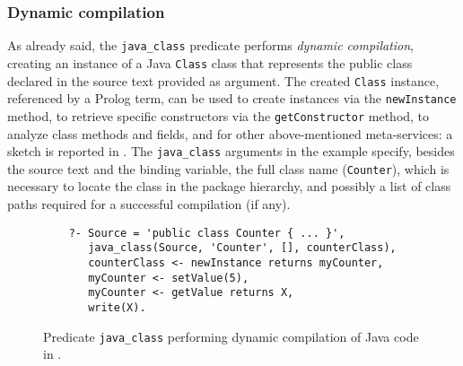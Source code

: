 \subsubsection{Dynamic compilation}

As already said, the \texttt{java\_class} predicate performs
\textit{dynamic compilation}, creating an instance of a Java
\texttt{Class} class that represents the public class declared in
the source text provided as argument.
%
The created \texttt{Class} instance, referenced by a Prolog term,
can be used to create instances via the \texttt{newInstance}
method, to retrieve specific constructors via the
\texttt{getConstructor} method, to analyze class methods and
fields, and for other above-mentioned meta-services: a sketch is
reported in .
%
The \texttt{java\_class} arguments in the example specify, besides
the source text and the binding variable, the full class name
(\texttt{Counter}), which is necessary to locate the class in the
package hierarchy, and possibly a list of class paths required
for a successful compilation (if any).

\begin{figure}
\caption{Predicate \texttt{java\_class} performing dynamic compilation of Java code in \tuprolog{}.
}
\begin{verbatim}
    ?- Source = 'public class Counter { ... }',
       java_class(Source, 'Counter', [], counterClass),
       counterClass <- newInstance returns myCounter,
       myCounter <- setValue(5),
       myCounter <- getValue returns X,
       write(X).
\end{verbatim}
\end{figure}

